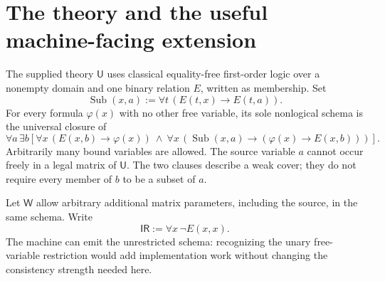 \documentclass[11pt]{article}
\newcommand{\ThU}{\mathsf U}
\newcommand{\ThW}{\mathsf W}
\newcommand{\IR}{\mathsf{IR}}
\newcommand{\Sub}{\operatorname{Sub}}
\theoremstyle{definition}\newtheorem{definition}[theorem]{Definition}
\begin{document}
\section{The theory and the useful machine-facing extension}

The supplied theory $\ThU$ uses classical equality-free first-order logic
over a nonempty domain and one binary relation $E$, written as membership.
Set
\[
 \Sub(x,a):=\forall t\,(E(t,x)\to E(t,a)).
\]
For every formula $\varphi(x)$ with no other free variable, its sole
nonlogical schema is the universal closure of
\begin{equation}\label{eq:U}
 \forall a\,\exists b\left[
  \forall x\,(E(x,b)\to\varphi(x))\ \land\
  \forall x\,(\Sub(x,a)\to(\varphi(x)\to E(x,b)))
 \right].
\end{equation}
Arbitrarily many bound variables are allowed. The source variable $a$
cannot occur freely in a legal matrix of $\ThU$. The two clauses describe
a weak cover; they do not require every member of $b$ to be a subset of $a$.

Let $\ThW$ allow arbitrary additional matrix parameters, including the source,
in the same schema. Write
\[
 \IR:=\forall x\,\neg E(x,x).
\]
The machine can emit the unrestricted schema: recognizing the unary
free-variable restriction would add implementation work without changing
the consistency strength needed here.
\end{document}
